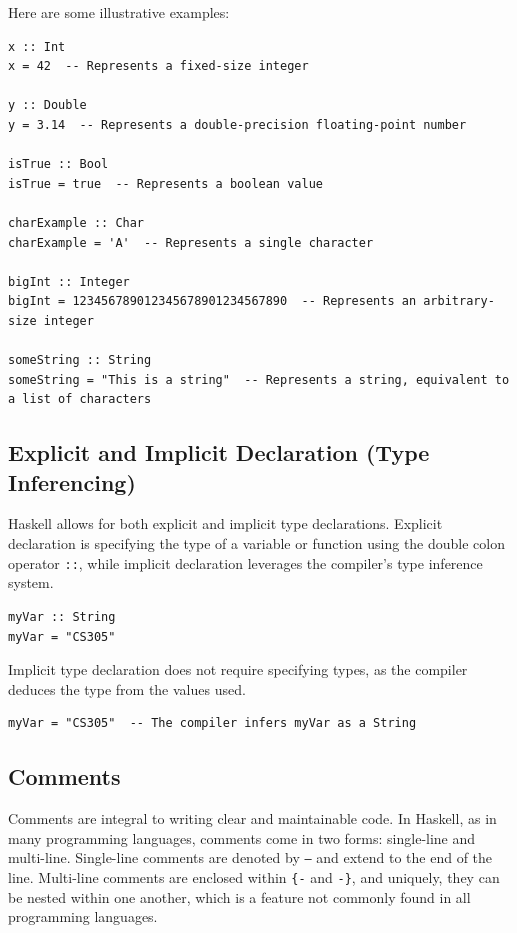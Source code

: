 \documentclass[a4paper, 10pt]{article}
\begin{document}
            \noindent Here are some illustrative examples:

            \begin{lstlisting}
x :: Int
x = 42  -- Represents a fixed-size integer

y :: Double
y = 3.14  -- Represents a double-precision floating-point number

isTrue :: Bool
isTrue = true  -- Represents a boolean value

charExample :: Char
charExample = 'A'  -- Represents a single character

bigInt :: Integer
bigInt = 123456789012345678901234567890  -- Represents an arbitrary-size integer

someString :: String
someString = "This is a string"  -- Represents a string, equivalent to a list of characters
            \end{lstlisting}

        \newpage
        \subsection{Explicit and Implicit Declaration (Type Inferencing)}
            \noindent Haskell allows for both explicit and implicit type declarations. Explicit declaration is specifying the type of a variable or function using the double colon operator \texttt{::}, while implicit declaration leverages the compiler's type inference system.

            \begin{lstlisting}
myVar :: String
myVar = "CS305"
            \end{lstlisting}

            Implicit type declaration does not require specifying types, as the compiler deduces the type from the values used.

            \begin{lstlisting}
myVar = "CS305"  -- The compiler infers myVar as a String
            \end{lstlisting}

        \subsection{Comments}
            Comments are integral to writing clear and maintainable code. In Haskell, as in many programming languages, comments come in two forms: single-line and multi-line. Single-line comments are denoted by \texttt{--} and extend to the end of the line. Multi-line comments are enclosed within \texttt{\{-} and \texttt{-\}}, and uniquely, they can be nested within one another, which is a feature not commonly found in all programming languages.
\end{document}
